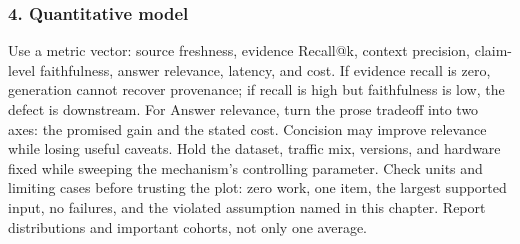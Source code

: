 \subsubsection*{4. Quantitative model}
Use a metric vector: source freshness, evidence Recall@k, context precision, claim-level faithfulness, answer relevance, latency, and cost. If evidence recall is zero, generation cannot recover provenance; if recall is high but faithfulness is low, the defect is downstream.
For Answer relevance, turn the prose tradeoff into two axes: the promised gain and the stated cost. Concision may improve relevance while losing useful caveats. Hold the dataset, traffic mix, versions, and hardware fixed while sweeping the mechanism's controlling parameter.
Check units and limiting cases before trusting the plot: zero work, one item, the largest supported input, no failures, and the violated assumption named in this chapter. Report distributions and important cohorts, not only one average.
